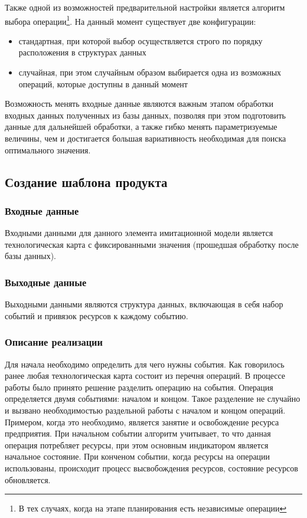 Также одной из возможностей предварительной настройки является алгоритм выбора операции\footnote{В тех случаях, когда на этапе планирования есть независимые операции}. На данный момент существует две конфигурации:

\begin{itemize}
    \item[1)] стандартная, при которой выбор осуществляется строго по порядку расположения в структурах данных
    \item[2)] случайная, при этом случайным образом выбирается одна из возможных операций, которые доступны в данный момент 
\end{itemize}

Возможность менять входные данные являются важным этапом обработки входных данных полученных из базы данных, позволяя при этом подготовить данные для дальнейшей обработки, а также гибко менять параметризуемые величины, чем и достигается большая вариативность необходимая для поиска оптимального значения. 

\subsection{Создание шаблона продукта}

\subsubsection*{Входные данные}
Входными данными для данного элемента имитационной модели является технологическая карта с фиксированными значения (прошедшая обработку после базы данных).

\subsubsection*{Выходные данные}
\label{imcore:mkProductTemplate_output_data}
Выходными данными являются структура данных, включающая в себя набор событий и привязок ресурсов к каждому событию.

\subsubsection*{Описание реализации}
Для начала необходимо определить для чего нужны события. Как говорилось ранее любая технологическая карта состоит из перечня операций. В процессе работы было принято решение разделить операцию на события. Операция определяется двумя событиями: началом и концом. Такое разделение не случайно и вызвано необходимостью раздельной работы с началом и концом операций. Примером, когда это необходимо, является занятие и освобождение ресурса предприятия. При начальном событии алгоритм учитывает, то что данная операция потребляет ресурсы, при этом основным индикатором является начальное состояние. При конченом событии, когда ресурсы на операции использованы, происходит процесс высвобождения ресурсов, состояние ресурсов обновляется.


